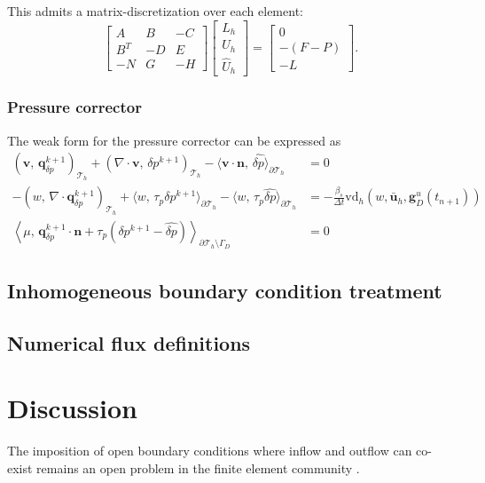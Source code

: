 This admits a matrix-discretization over each element:
\begin{equation}
  \begin{bmatrix}
   A   &  B & -C \\
   B^T &  -D & E \\
   -N & G &  -H
  \end{bmatrix}
  \begin{bmatrix} L_h \\ U_h \\ \widehat{U}_h \end{bmatrix}
  =
  \begin{bmatrix} 0 \\ -(F - P) \\ -L \end{bmatrix}.
\end{equation}

\subsubsection{Pressure corrector}%
The weak form for the pressure corrector can be expressed as 
\begin{equation}
\begin{aligned}
(\bm{v},\,  \bm{q}_{\delta p}^{k+1})_{\mathcal{T}_h}
+ ( \nabla \cdot \bm{v} ,\, \delta p^{k+1})_{\mathcal{T}_h}
- \langle \bm{v}\cdot\bm{n} ,\, \widehat{\delta p} \rangle_{\partial \mathcal{T}_h} &= 0 \\
-(w ,\, \nabla \cdot \bm{q}_{\delta p}^{k+1})_{\mathcal{T}_h}
+ \langle w,\, \tau_p \delta p^{k+1}\rangle_{\partial \mathcal{T}_h} 
- \langle w,\, \tau_p \widehat{\delta p} \rangle_{\partial \mathcal{T}_h} 
&= - \frac{\beta_s}{\Delta t} \text{vd}_h(w,\bar{\bm{u}}_h, \bm{g}_D^u(t_{n+1}))  \\
\left\langle \mu ,\, \bm{q}_{\delta p}^{k+1} \cdot\bm{n} + \tau_p(\delta p^{k+1} - \widehat{\delta p})
\right\rangle_{\partial \mathcal{T}_h \setminus \Gamma_D} &= 0 
\end{aligned}
\end{equation}



\subsection{Inhomogeneous boundary condition treatment}
\subsection{Numerical flux definitions}

\section{Discussion}%

The imposition of open boundary conditions where inflow and outflow can co-exist remains an open problem in the finite element community \cite{sani_resume_1994}. 

